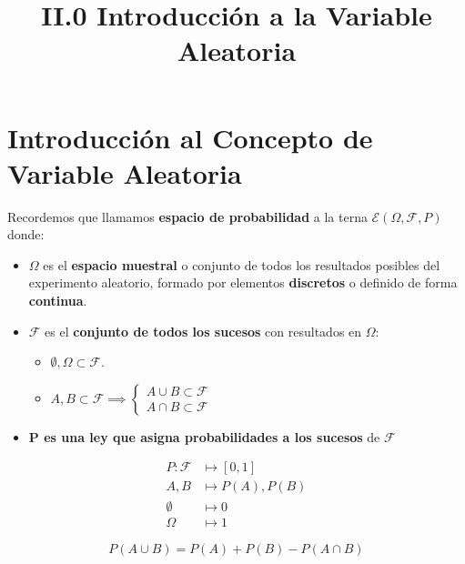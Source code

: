 \documentclass[11pt]{article}
\title{II.0 Introducción a la Variable Aleatoria}
\providecommand{\tightlist}{%
      \setlength{\itemsep}{0pt}\setlength{\parskip}{0pt}}
\begin{document}
    
    
    \maketitle
    
    

    
    \hypertarget{ii.0-introducciuxf3n-al-concepto-de-variable-aleatoria}{%
\section*{Introducción al Concepto de Variable
Aleatoria}\label{ii.0-introducciuxf3n-al-concepto-de-variable-aleatoria}}

Recordemos que llamamos \textbf{espacio de probabilidad} a la terna
\(\mathscr{E}(\Omega, \mathscr{F}, P)\) donde:

\begin{itemize}
\tightlist
\item
  \(\Omega\) es el \textbf{espacio muestral} o conjunto de todos los
  resultados posibles del experimento aleatorio, formado por elementos
  \textbf{discretos} o definido de forma \textbf{continua}.
\item
  \(\mathscr{F}\) es el \textbf{conjunto de todos los sucesos} con
  resultados en \(\Omega\):

  \begin{itemize}
  \tightlist
  \item
    \(\emptyset, \Omega \subset \mathscr{F}\).
  \item
    \(A, B \subset \mathscr{F} \implies \left\{\begin{matrix} A \cup B \subset \mathscr{F} \\  A \cap B \subset \mathscr{F}  \end{matrix}\right.\)
  \end{itemize}
\item
  \textbf{P es una ley que asigna probabilidades a los sucesos} de
  \(\mathscr{F}\)
\end{itemize}

\begin{align*}
P:  \mathscr{F} & \longmapsto [0, 1]\\
   A, B & \longmapsto P(A), P(B)\\
   \emptyset & \longmapsto 0\\
   \Omega & \longmapsto 1
   \end{align*}

\[P(A \cup B) = P(A)+P(B)-P(A\cap B)\]
\end{document}
